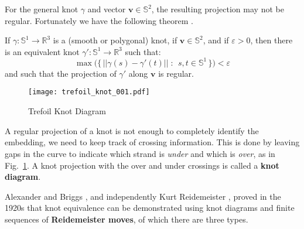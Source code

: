     For the general knot $\gamma$ and vector $\mathbf{v}\in\mathbb{S}^{2}$, the
    resulting projection may not be regular. Fortunately we have the following
    theorem \cite[p.~22]{LivingstonKnotTheory}.
    \begin{theorem}
        If $\gamma:\mathbb{S}^{1}\rightarrow\mathbb{R}^{3}$ is a
        (smooth or polygonal) knot, if $\mathbf{v}\in\mathbb{S}^{2}$, and if
        $\varepsilon>0$, then there is an equivalent knot
        $\gamma':\mathbb{S}^{1}\rightarrow\mathbb{R}^{3}$ such that:
        \begin{equation}
            \max\big(
                \{\,||\gamma(s)-\gamma'(t)||\;:\;\,s,t\in\mathbb{S}^{1}\,\}
            \big)<\varepsilon
        \end{equation}
        and such that the projection of $\gamma'$ along $\mathbf{v}$ is regular.
    \end{theorem}
    \begin{figure}
        \centering
        \texttt{[image: trefoil\_knot\_001.pdf]}
        \caption{Trefoil Knot Diagram}
        \label{fig:trefoil_knot_001}
    \end{figure}
    A regular projection of a knot is not enough to completely identify the
    embedding, we need to keep track of crossing information. This is done by
    leaving gaps in the curve to indicate which strand is \textit{under} and
    which is \textit{over}, as in Fig.~\ref{fig:trefoil_knot_001}. A
    knot projection with the over and under crossings is called a
    \textbf{knot diagram}.
    \par\hfill\par
    Alexander and Briggs \cite{AlexanderBriggs1926}, and independently
    Kurt Reidemeister \cite{Reidemeister1927}, proved in the 1920s that
    knot equivalence can be demonstrated using knot diagrams and finite
    sequences of \textbf{Reidemeister moves}, of which there are three types.
